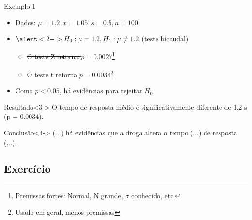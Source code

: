 \documentclass{beamer}
\begin{document}
\begin{frame}{\scriptsize Exemplo 1}
    \begin{itemize}
      \scriptsize
    \item Dados: $\mu = 1.2, \bar{x} = 1.05, s = 0.5, n=100$
    \item $\alert<2->{H_0: \mu = 1.2}, H_1: \mu \ne 1.2$ (teste bicaudal)
      \begin{itemize}
        \scriptsize
      \item \sout{O teste Z retorna $p = 0.0027$}\footnote{\scriptsize Premissas fortes: Normal, N grande, $\sigma$ conhecido, etc.}
      \item O teste t retorna $p = 0.0034$\footnote{\scriptsize Usado em geral, menos premissas}
      \end{itemize}
    \item<2-> Como $p < 0.05$, há evidências para rejeitar \alert<2->{$H_0$}.
    \end{itemize}
  \begin{exampleblock}{Resultado}<3->
    \footnotesize
    O tempo de resposta médio é \alert{significativamente} diferente de 1.2 s ({\footnotesize p = 0.0034}).
  \end{exampleblock}
  \begin{exampleblock}{Conclusão}<4->
    \footnotesize
    (...) há evidências que a droga altera o tempo (...)  de resposta (...).
  \end{exampleblock}

\end{frame}

\subsection{Exercício}
\end{document}
